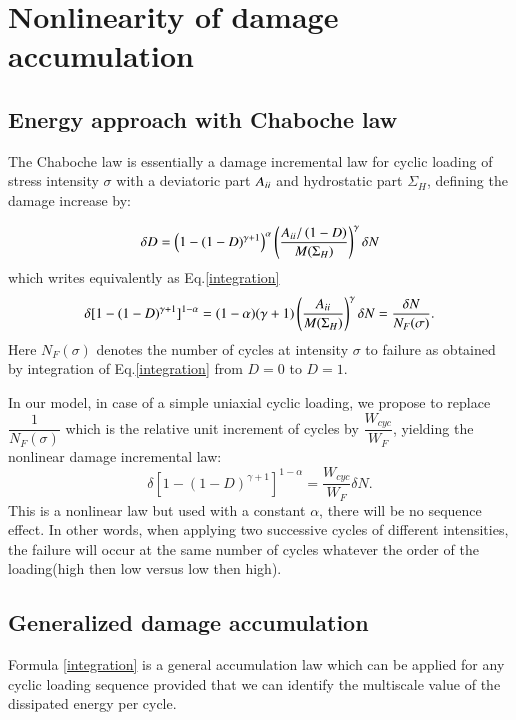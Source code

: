 \documentclass[3p,times,number,review]{elsarticle}
\begin{document}
\section{Nonlinearity of damage accumulation}
\subsection{Energy approach with Chaboche law}
The Chaboche law\cite{lemaitre1990mechanics} is essentially a damage incremental law for cyclic loading of stress intensity $\sigma$ with a deviatoric part ${A}_{\uppercase\expandafter{\romannumeral2}}$ and hydrostatic part $\Sigma_H$, defining the damage increase by:

 \begin{equation}\delta D = \left( 1 -(1-D)^{\gamma+1}\right)^\alpha \left(\frac{{A}_{\uppercase\expandafter{\romannumeral2}}/\left( 1-D\right) }{M(\Sigma_H)}\right)^\gamma \delta N
 \label{chabochemulti}
 \end{equation} 
 which writes equivalently as Eq.\eqref{integration}
   \begin{equation}\delta [1-(1-D)^{\gamma+1}]^{1-\alpha}=(1-\alpha)(\gamma+1)\left(\dfrac{{A}_{\uppercase\expandafter{\romannumeral2}} }{M(\Sigma_H)}\right)^\gamma \delta N=\dfrac{\delta N}{N_F(\sigma)}.
   \label{integration}
   \end{equation}
Here $N_F(\sigma)$ denotes the number of cycles at intensity $\sigma$ to failure as obtained by integration of Eq.\eqref{integration} from $D=0$ to $D=1$.

In our model, in case of a simple uniaxial cyclic loading, we propose to replace $\dfrac{1}{N_F(\sigma)}$ which is the relative unit increment of cycles by $\dfrac{W_{cyc}}{W_F}$, yielding the nonlinear damage incremental law:
	\begin{equation}
	\delta[1-(1-D)^{\gamma+1}]^{1-\alpha}=\dfrac{W_{cyc}}{W_F}\delta N.
\label{integrationW}
\end{equation}
This is a nonlinear law but used with a constant $\alpha$, there will be no sequence effect. In other words,
 when applying two successive cycles of different intensities, the failure will occur at the same number of cycles whatever the order of the loading(high then low versus low then high).
 
\subsection{Generalized damage accumulation}
Formula \eqref{integration} is a general accumulation law which can be applied for any cyclic loading sequence provided that we can identify the multiscale value of the dissipated energy per cycle. 
\end{document}
